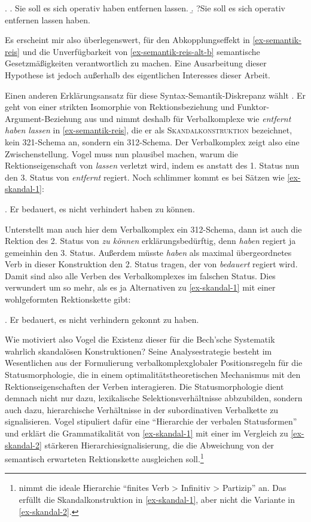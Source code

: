 \ex. \label{ex-semantik-invert}
\a. Sie soll es sich operativ haben entfernen lassen. \label{ex-semantik-invert-a}
\b. ?Sie soll es sich operativ entfernen lassen haben.

Es erscheint mir also überlegenswert, für den Abkopplungseffekt in \ref{ex-semantik-reis} und die Unverfügbarkeit von \ref{ex-semantik-reis-alt-b} semantische Gesetzmä\ss igkeiten verantwortlich zu machen. Eine Ausarbeitung dieser Hypothese ist jedoch au\ss erhalb des eigentlichen Interesses dieser Arbeit.  

Einen anderen Erklärungsansatz für diese Syntax-Semantik-Diskrepanz wählt \cite{Vogel:09}. Er geht von einer strikten Isomorphie von Rektionsbeziehung und Funktor-Argument-Bezie\-hung aus und nimmt deshalb für Verbalkomplexe wie {\it entfernt haben lassen} in \ref{ex-semantik-reis}, die er als \textsc{Skandalkonstruktion} bezeichnet, kein 321-Schema an, sondern ein 312-Schema. Der Verbalkomplex zeigt also eine Zwischenstellung. Vogel muss nun plausibel machen, warum die Rektionseigenschaft von {\it lassen} verletzt wird, indem es anstatt des 1. Status nun den 3. Status von {\it entfernt} regiert. Noch schlimmer kommt es bei Sätzen wie \ref{ex-skandal-1}:

\ex. Er bedauert, es nicht verhindert haben zu können. \hfill \citep[(1)]{Vogel:09}\label{ex-skandal-1}

Unterstellt man auch hier dem Verbalkomplex ein 312-Schema, dann ist auch die Rektion des 2. Status von {\it zu können} erklärungsbedürftig, denn {\it haben} regiert ja gemeinhin den 3. Status. Au\ss erdem müsste {\it haben} als maximal übergeordnetes Verb in dieser Konstruktion den 2. Status tragen, der von {\it bedauert} regiert wird. Damit sind also alle Verben des Verbalkomplexes im falschen Status. Dies verwundert um so mehr, als es ja Alternativen zu \ref{ex-skandal-1} mit einer wohlgeformten Rektionskette gibt:  

\ex. Er bedauert, es nicht verhindern gekonnt zu haben. \hfill \citep[(9d)]{Vogel:09}\label{ex-skandal-2}

Wie motiviert also Vogel die Existenz dieser für die Bech'sche Systematik wahrlich skandalösen Konstruktionen? Seine Analysestrategie besteht im Wesentlichen aus der Formulierung verbalkomplexglobaler Positionsregeln für die Statusmorphologie, die in einem optimalitätstheoretischen Mechanismus mit den Rektionseigenschaften der Verben interagieren. Die Statusmorphologie dient demnach nicht nur dazu, lexikalische Selektionsverhältnisse abbzubilden, sondern auch dazu, hierarchische Verhältnisse in der subordinativen Verbalkette zu signalisieren. Vogel stipuliert dafür eine "`Hierarchie der verbalen Statusformen"' und erklärt die Grammatikalität von \ref{ex-skandal-1} mit einer im Vergleich zu \ref{ex-skandal-2} stärkeren Hierarchiesignalisierung, die die Abweichung von der semantisch erwarteten Rektionskette ausgleichen soll.\footnote{\citet[(52)]{Vogel:09} nimmt die ideale Hierarchie "`finites Verb > Infinitiv > Partizip"' an. Das erfüllt die Skandalkonstruktion in \ref{ex-skandal-1}, aber nicht die Variante in \ref{ex-skandal-2}.}

